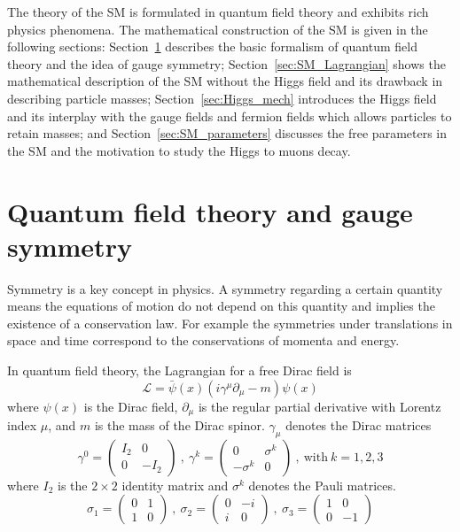 The theory of the SM is formulated in quantum field theory and exhibits rich physics phenomena.
The mathematical construction of the SM is given in the following sections:
Section~\ref{sec:gauge_symmetry} describes the basic formalism of quantum field theory and the idea of gauge symmetry;
Section~\ref{sec:SM_Lagrangian} shows the mathematical description of the SM without the Higgs field and its drawback in describing particle masses;
Section~\ref{sec:Higgs_mech} introduces the Higgs field and its interplay with the gauge fields and fermion fields which allows particles to retain masses;
and Section~\ref{sec:SM_parameters} discusses the free parameters in the SM and the motivation to study the Higgs to muons decay.


\section{Quantum field theory and gauge symmetry}\label{sec:gauge_symmetry}

Symmetry is a key concept in physics. 
A symmetry regarding a certain quantity means the equations of motion do not depend on this quantity
and implies the existence of a conservation law.
For example the symmetries under translations in space and time correspond to the conservations of momenta and energy.

In quantum field theory, the Lagrangian for a free Dirac field is 
\begin{equation}\label{eq:Dirac_Lagrangian}
    \mathcal{L} = \bar{\psi}(x)(i\gamma^{\mu}\partial_{\mu}-m)\psi(x)
\end{equation}
where $\psi(x)$ is the Dirac field,
$\partial_{\mu}$ is the regular partial derivative with Lorentz index $\mu$,
and $m$ is the mass of the Dirac spinor.
$\gamma_{\mu}$ denotes the Dirac matrices
\begin{equation}\label{eq:dirac_matrices}
    \gamma^{0} = \begin{pmatrix}  I_{2} & 0 \\ 0 & -I_{2}    \end{pmatrix} ~,~
    \gamma^{k} = \begin{pmatrix}  0 & \sigma^{k} \\ -\sigma^{k} & 0 \end{pmatrix} ~,~
    \text{with} ~ k = 1,2,3 
\end{equation}
where $I_{2}$ is the $2 \times 2$ identity matrix and $\sigma^{k}$ denotes the Pauli matrices.
\begin{equation}\label{eq:pauli_matrices}
    \sigma_{1} = \begin{pmatrix} 0 & 1 \\ 1 & 0 \end{pmatrix} ~,~
    \sigma_{2} = \begin{pmatrix} 0 & -i \\ i & 0\end{pmatrix} ~,~
    \sigma_{3} = \begin{pmatrix} 1 & 0 \\ 0 & -1\end{pmatrix}
\end{equation}

